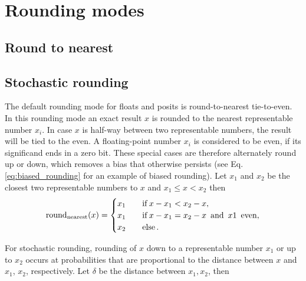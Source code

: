 

\section{Rounding modes}
\label{sec:rounding}

\subsection{Round to nearest}
\label{sec:roundnearest}

\subsection{Stochastic rounding}
\label{sec:stochastic_rounding} 

The default rounding mode for floats and posits is round-to-nearest tie-to-even. In this rounding mode an exact result $x$ is rounded
to the nearest representable number $x_i$. In case $x$ is half-way between two representable numbers, the result will be tied to the
even. A floating-point number $x_i$ is considered to be even, if its significand ends in a zero bit. These special cases are therefore
alternately round up or down, which removes a bias that otherwise persists (see Eq. \ref{eq:biased_rounding} for an example of biased rounding).
Let $x_1$ and $x_2$ be the closest two representable numbers to $x$ and $x_1 \leq x < x_2$ then
\begin{equation}
\operatorname{round}_{\operatorname{nearest}}(x) =
\begin{cases}
x_1 \quad &\operatorname{if} x - x_1 < x_2 - x,  \\
x_1 &\operatorname{if} x-x_1 = x_2 - x \operatorname{~and~} x1 \operatorname{~even}, \\
x_2 &\operatorname{else}.
\end{cases}
\label{eq:roundnearest}
\end{equation}

For stochastic rounding, rounding of $x$ down to a representable number $x_1$ or up to $x_2$ occurs at probabilities that are proportional
to the distance between $x$ and $x_1$, $x_2$, respectively. Let $\delta$ be the distance between $x_1,x_2$, then

